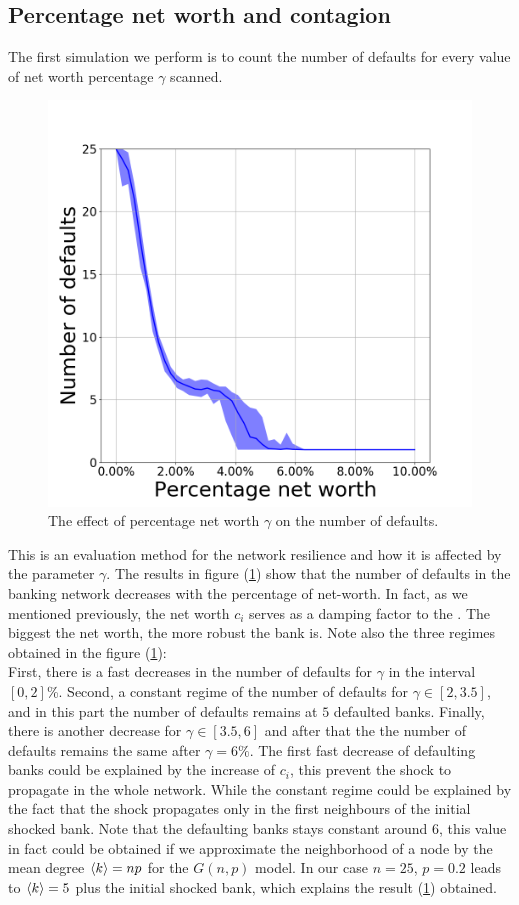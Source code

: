 \documentclass[14pt]{article}
\providecommand{\reff}[1]{(\ref{#1})}
\begin{document}
\subsection{Percentage net worth and contagion}
The first simulation we perform is to count the number of defaults for every value of net worth percentage $\gamma$ scanned. 
\begin{figure}[h]
    \centering
  \includegraphics[width=0.6\linewidth]{img/Figure_3zbi.png}
  \caption{The effect of percentage net worth $\gamma$ on the number of defaults.}
  \label{fig:3}
\end{figure}
This is an evaluation method for the network resilience and how it is affected by the parameter $\gamma$. The results in figure \reff{fig:3} show that the number of defaults in the banking network decreases with the percentage of net-worth. In fact, as we mentioned previously, the net worth $c_i$ serves as a damping factor to the . The biggest the net worth, the more robust the bank is. Note also the three regimes obtained in the figure \reff{fig:3}:
\\First, there is a fast decreases in the number of defaults for $\gamma$ in the interval 
$[0,2]$\%. Second, a constant regime of the number of defaults for $\gamma \in [2,3.5]$, and in this part the number of defaults remains at $5$ defaulted banks. Finally, there is another decrease for $\gamma \in [3.5,6]$ and after that the the number of defaults remains the same after $\gamma = 6 \%$. The first fast decrease of defaulting banks could be explained by the  increase of $c_i$, this prevent the shock to propagate in the whole network. While the constant regime could be explained by the fact that the shock propagates only in the first neighbours of the initial shocked bank. Note that the defaulting banks stays constant around $6$, this value in fact could be obtained if we approximate the neighborhood of a node by the mean degree $\braket{k}=np$ for the $G(n,p)$ model. In our case $n=25$, $p=0.2$ leads to $\braket{k}=5$ plus the initial shocked bank, which explains the result \reff{fig:3} obtained.
\end{document}

